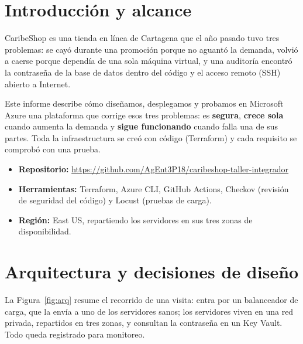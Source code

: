 \section{Introducción y alcance}
CaribeShop es una tienda en línea de Cartagena que el año pasado tuvo tres problemas: se cayó
durante una promoción porque no aguantó la demanda, volvió a caerse porque dependía de una sola
máquina virtual, y una auditoría encontró la contraseña de la base de datos dentro del código y
el acceso remoto (SSH) abierto a Internet.

Este informe describe cómo diseñamos, desplegamos y probamos en Microsoft Azure una plataforma
que corrige esos tres problemas: es \textbf{segura}, \textbf{crece sola} cuando aumenta la demanda
y \textbf{sigue funcionando} cuando falla una de sus partes. Toda la infraestructura se creó con
código (Terraform) y cada requisito se comprobó con una prueba.

\begin{itemize}
  \item \textbf{Repositorio:} \url{https://github.com/AgEnt3P18/caribeshop-taller-integrador}
  \item \textbf{Herramientas:} Terraform, Azure CLI, GitHub Actions, Checkov (revisión de seguridad
        del código) y Locust (pruebas de carga).
  \item \textbf{Región:} East US, repartiendo los servidores en sus tres zonas de disponibilidad.
\end{itemize}

\section{Arquitectura y decisiones de diseño}
La Figura~\ref{fig:arq} resume el recorrido de una visita: entra por un balanceador de carga, que
la envía a uno de los servidores sanos; los servidores viven en una red privada, repartidos en
tres zonas, y consultan la contraseña en un Key Vault. Todo queda registrado para monitoreo.

